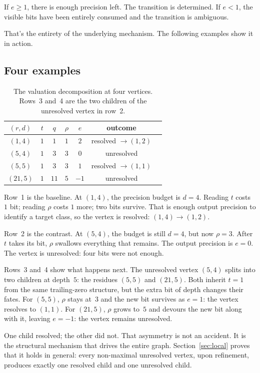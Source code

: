 \documentclass[11pt]{amsart}
\theoremstyle{definition}
\theoremstyle{remark}
\begin{document}
If $e\ge1$, there is enough precision left.  The transition is determined.  If $e<1$, the visible bits have been entirely consumed and the transition is ambiguous.

That's the entirety of the underlying mechanism. The following examples show it in action.

\subsection{Four examples}\label{subsec:examples}

\begin{table}[h]
\centering
\begin{tabular}{ccccccl}
\hline
$(r,d)$ & $t$ & $q$ & $\rho$ & $e$ & outcome \\
\hline
$(1,4)$ & $1$ & $1$ & $1$ & $2$ & resolved $\to(1,2)$ \\
$(5,4)$ & $1$ & $3$ & $3$ & $0$ & unresolved \\
$(5,5)$ & $1$ & $3$ & $3$ & $1$ & resolved $\to(1,1)$ \\
$(21,5)$ & $1$ & $11$ & $5$ & $-1$ & unresolved \\
\hline
\end{tabular}
\smallskip
\caption{The valuation decomposition at four vertices.  Rows~3 and~4 are the two children of the unresolved vertex in row~2.}
\label{tab:examples}
\end{table}

Row~1 is the baseline.  At $(1,4)$, the precision budget is $d=4$.  Reading $t$ costs $1$ bit; reading $\rho$ costs $1$ more; two bits survive.  That is enough output precision to identify a target class, so the vertex is resolved: $(1,4)\to(1,2)$.

Row~2 is the contrast.  At $(5,4)$, the budget is still $d=4$, but now $\rho=3$.  After $t$ takes its bit, $\rho$ swallows everything that remains.  The output precision is $e=0$.  The vertex is unresolved: four bits were not enough.

Rows~3 and~4 show what happens next.  The unresolved vertex $(5,4)$ splits into two children at depth~$5$: the residues $(5,5)$ and $(21,5)$.  Both inherit $t=1$ from the same trailing-zero structure, but the extra bit of depth changes their fates.  For $(5,5)$, $\rho$ stays at~$3$ and the new bit survives as $e=1$: the vertex resolves to $(1,1)$.  For $(21,5)$, $\rho$ grows to~$5$ and devours the new bit along with it, leaving $e=-1$: the vertex remains unresolved.

One child resolved; the other did not.  That asymmetry is not an accident. It is the structural mechanism that drives the entire graph.  Section~\ref{sec:local} proves that it holds in general: every non-maximal unresolved vertex, upon refinement, produces exactly one resolved child and one unresolved child.
\end{document}
